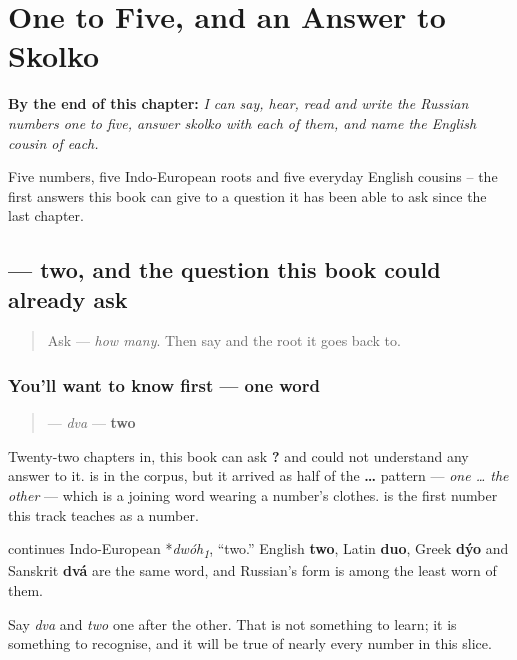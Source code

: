 
\chapter{One to Five, and an Answer to Skolko}
\label{ch:ru-count-five}

\begin{chapteropening}
\textbf{By the end of this chapter:} \emph{I can say, hear, read and write the Russian numbers one to five, answer skolko with each of them, and name the English cousin of each.}

Five numbers, five Indo-European roots and five everyday English cousins -- the first answers this book can give to a question it has been able to ask since the last chapter.
\end{chapteropening}

\section[\texorpdfstring{\ru{два} (dva)}{два (dva)}]{ — two, and the question this book could already ask}

\label{lesson:RU-C23-dva}



\begin{quote}
Ask \textbf{} — \emph{how many}. Then say \textbf{} and the root it goes back to.
\end{quote}

\subsection*{You'll want to know first — one word}
\begin{quote}
\textbf{} — \emph{dva} — \textbf{two}
\end{quote}

Twenty-two chapters in, this book can ask \textbf{?} and could not understand any answer to it. \textbf{} is in the corpus, but it arrived as half of the \textbf{ … } pattern — \emph{one … the other} — which is a joining word wearing a number's clothes. \textbf{} is the first number this track teaches as a number.

\begin{cousinweb}
\textbf{} continues Indo-European *\emph{dwóh\textsubscript{1}}, \textquotedblleft{}two.\textquotedblright{} English \textbf{two}, Latin \textbf{duo}, Greek \textbf{dýo} and Sanskrit \textbf{dvá} are the same word, and Russian's form is among the least worn of them.

Say \emph{dva} and \emph{two} one after the other. That is not something to learn; it is something to recognise, and it will be true of nearly every number in this slice.
\end{cousinweb}

